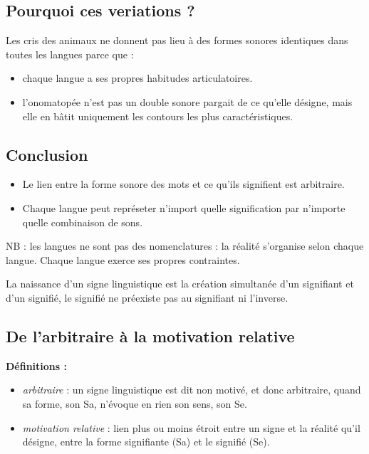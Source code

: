 \subsection{Pourquoi ces veriations ?}
Les cris des animaux ne donnent pas lieu à des formes sonores identiques dans toutes les langues parce que : 
\begin{itemize}
         \item chaque langue a ses propres habitudes articulatoires.
         \item l'onomatopée n'est pas un double sonore pargait de ce qu'elle désigne, mais elle en bâtit uniquement les contours les plus caractéristiques.
\end{itemize}

\subsection{Conclusion}
\begin{itemize}
         \item Le lien entre la forme sonore des mots et ce qu'ils signifient est arbitraire.
         \item Chaque langue peut représeter n'import quelle signification par n'importe quelle combinaison de sons.
\end{itemize}

NB : les langues ne sont pas des nomenclatures : la réalité s'organise selon chaque langue. Chaque langue exerce ses propres contraintes.

La naissance d'un signe linguistique est la création simultanée d'un signifiant et d'un signifié, le signifié ne préexiste pas au signifiant ni l'inverse.

\subsection{De l'arbitraire à la motivation relative}

\textbf{Définitions :}\\
   \begin{itemize} 
      \item \emph{arbitraire} : un signe linguistique est dit non motivé, et donc arbitraire, quand sa forme, son Sa, n'évoque en rien son sens, son Se.
      \item \emph{motivation relative} : lien plus ou moins étroit entre un signe et la réalité qu'il désigne, entre la forme signifiante (Sa) et le signifié (Se).
   \end{itemize}


